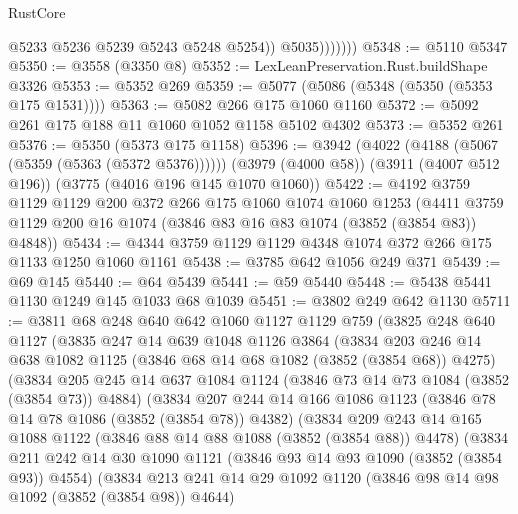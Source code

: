 \begin{lexlean}{RustCore}
\begin{coremodule}
                      @5233
                      @5236
                      @5239
                      @5243
                      @5248
                      @5254))
                  @5035)))))))
@5348 := @5110 @5347
@5350 := @3558 (@3350 @8)
@5352 := LexLeanPreservation.Rust.buildShape @3326
@5353 := @5352 @269
@5359 := @5077 (@5086 (@5348 (@5350 (@5353 @175 @1531))))
@5363 := @5082 @266 @175 @1060 @1160
@5372 := @5092 @261 @175 @188 @11 @1060 @1052 @1158 @5102 @4302
@5373 := @5352 @261
@5376 := @5350 (@5373 @175 @1158)
@5396 := @3942
    (@4022 (@4188 (@5067 (@5359 (@5363 (@5372 @5376))))))
    (@3979 (@4000 @58))
    (@3911 (@4007 @512 @196))
    (@3775 (@4016 @196 @145 @1070 @1060))
@5422 := @4192
    @3759
    @1129
    @1129
    @200
    @372
    @266
    @175
    @1060
    @1074
    @1060
    @1253
    (@4411 @3759 @1129 @200 @16 @1074 (@3846 @83 @16 @83 @1074 (@3852 (@3854 @83)) @4848))
@5434 := @4344 @3759 @1129 @1129 @4348 @1074 @372 @266 @175 @1133 @1250 @1060 @1161
@5438 := @3785 @642 @1056 @249 @371
@5439 := @69 @145
@5440 := @64 @5439
@5441 := @59 @5440
@5448 := @5438 @5441 @1130 @1249 @145 @1033 @68 @1039
@5451 := @3802 @249 @642 @1130
@5711 := @3811
    @68
    @248
    @640
    @642
    @1060
    @1127
    @1129
    @759
    (@3825
      @248
      @640
      @1127
      (@3835
        @247
        @14
        @639
        @1048
        @1126
        @3864
        (@3834
          @203
          @246
          @14
          @638
          @1082
          @1125
          (@3846 @68 @14 @68 @1082 (@3852 (@3854 @68)) @4275)
          (@3834
            @205
            @245
            @14
            @637
            @1084
            @1124
            (@3846 @73 @14 @73 @1084 (@3852 (@3854 @73)) @4884)
            (@3834
              @207
              @244
              @14
              @166
              @1086
              @1123
              (@3846 @78 @14 @78 @1086 (@3852 (@3854 @78)) @4382)
              (@3834
                @209
                @243
                @14
                @165
                @1088
                @1122
                (@3846 @88 @14 @88 @1088 (@3852 (@3854 @88)) @4478)
                (@3834
                  @211
                  @242
                  @14
                  @30
                  @1090
                  @1121
                  (@3846 @93 @14 @93 @1090 (@3852 (@3854 @93)) @4554)
                  (@3834
                    @213
                    @241
                    @14
                    @29
                    @1092
                    @1120
                    (@3846 @98 @14 @98 @1092 (@3852 (@3854 @98)) @4644)

\end{coremodule}
\end{lexlean}
